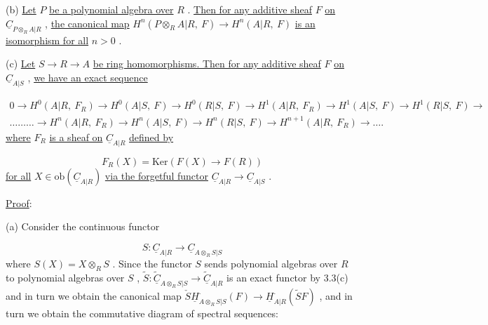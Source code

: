 (b)  \underline{Let}  $P$  \underline{be a polynomial algebra over}  $R$  . \underline{Then for any additive sheaf}  $F$  \underline{on}  $\underline{C}_{P\otimes_R A|R}$  , \underline{the canonical map}  $H^n(P\otimes_R A|R,\ F) \to H^n(A|R,\ F)$  \underline{is an isomorphism for all}  $n > 0$  .

(c)  \underline{Let}  $S \to R \to A$  \underline{be ring homomorphisms. Then for any additive sheaf}  $F$  \underline{on}  $\underline{C}_{A|S}$  , \underline{we have an exact sequence}

{\small \begin{multline*}
0 \to H^0(A|R,\ F_R) \to H^0(A|S,\ F) \to H^0(R|S,\ F) \to H^1(A|R,\ F_R) \to H^1(A|S,\ F) \to H^1(R|S,\ F) \to \\ \ldots\ldots\ldots \to H^n(A|R,\ F_R) \to H^n(A|S,\ F) \to H^n(R|S,\ F) \to H^{n+1}(A|R,\ F_R) \to \ldots.
\end{multline*}}
\underline{where}  $F_R$  \underline{is a sheaf on}  $\underline{C}_{A|R}$ \underline{defined by}

\begin{equation*}
F_R(X) = \mathrm{Ker}(F(X) \to F(R))
\end{equation*}
\underline{for all}  $X \in \mathrm{ob}(\underline{C}_{A|R})$  \underline{via the forgetful functor}  $\underline{C}_{A|R} \to \underline{C}_{A|S}$  .


\underline{Proof}:

(a)  Consider the continuous functor

\begin{equation*}
S : \underline{C}_{A|R} \to \underline{C}_{A\otimes_R S|S}
\end{equation*}
where  $S(X) = X\otimes_R S$  . Since the functor  $S$  sends polynomial algebras over  $R$  to polynomial algebras over  $S$  ,  $\widetilde{S} : \widetilde{\underline{C}}_{A\otimes_R S|S} \to \widetilde{\underline{C}}_{A|R}$  is an exact functor by 3.3(c) and in turn we obtain the canonical map  $\check{S}\underline{H}^{\cdot}_{A\otimes_R S|S}(F) \to \underline{H}^{\cdot}_{A|R}(\widetilde{S}F)$  , and in turn we obtain the commutative diagram of spectral sequences:

